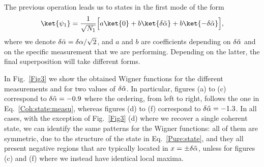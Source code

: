 The previous operation leads us to states in the first mode of the form
\begin{equation}\label{Pure:state}
    \ket{\psi_1}
        = \dfrac{1}{\sqrt{N_1}}
            \Big[ 
                 a \ket{0}
                 + b\ket{\delta \Tilde{\alpha}}
                 + b \ket{-\delta \Tilde{\alpha}}
            \Big],
\end{equation}
where we denote $\delta \Tilde{\alpha} = \delta \alpha/\sqrt{2}$, and $a$ and $b$ are coefficients depending on $\delta\Tilde{\alpha}$ and on the specific measurement that we are performing. Depending on the latter, the final superposition will take different forms. 

In Fig.~\ref{Fig3} we show the obtained Wigner functions for the different measurements and for two values of $\delta \Tilde{\alpha}$. In particular, figures (a) to (c) correspond to $\delta \Tilde{\alpha} = -0.9$ where the ordering, from left to right, follows the one in Eq.~\eqref{Coh:state:measu}, whereas figures (d) to (f) correspond to $\delta \Tilde{\alpha} = -1.3$. In all cases, with the exception of Fig.~\ref{Fig3} (d) where we recover a single coherent state, we can identify the same patterns for the Wigner functions: all of them are symmetric, due to the structure of the state in Eq.~\eqref{Pure:state}, and they all present negative regions that are typically located in $x = \pm \delta \Tilde{\alpha}$, unless for figures (c) and (f) where we instead have identical local maxima. 

